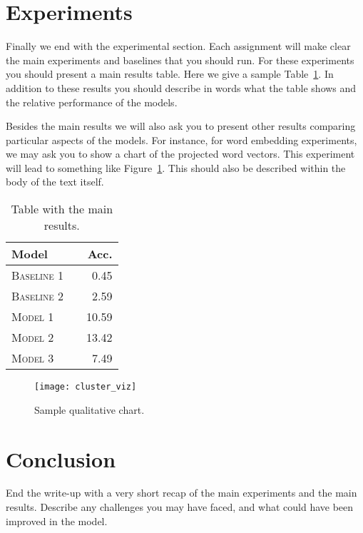 \documentclass[11pt]{article}
\begin{document}
\section{Experiments}

Finally we end with the experimental section. Each assignment will make clear the main experiments and baselines that you should run. For these experiments you should present a main results table. Here we give a sample Table~\ref{tab:results}. In addition to these results you should describe in words what the table shows and the relative performance of the models.

Besides the main results we will also ask you to present other results
comparing particular aspects of the models. For instance, for word
embedding experiments, we may ask you to show a chart of the projected
word vectors. This experiment will lead to something like
Figure~\ref{fig:clusters}. This should also be described within the
body of the text itself.


\begin{table}[h]
\centering
\begin{tabular}{llr}
 \toprule
 Model &  & Acc. \\
 \midrule
 \textsc{Baseline 1} & & 0.45\\
 \textsc{Baseline 2} & & 2.59 \\
 \textsc{Model 1} & & 10.59  \\
 \textsc{Model 2} & &13.42 \\
 \textsc{Model 3} & & 7.49\\
 \bottomrule
\end{tabular}
\caption{\label{tab:results} Table with the main results.}
\end{table}


\begin{figure}
  \centering
  \texttt{[image: cluster\_viz]}
  \caption{\label{fig:clusters} Sample qualitative chart.}
\end{figure}


\section{Conclusion}

End the write-up with a very short recap of the main experiments and the main results. Describe any challenges you may have faced, and what could have been improved in the model.



\end{document}
